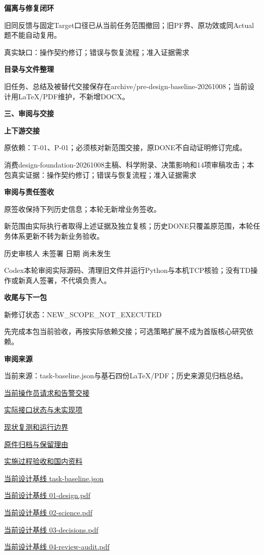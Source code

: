\documentclass[11pt,a4paper]{article}
\newcommand{\reviewsection}[1]{\par\Needspace{5\baselineskip}\vspace{10pt}\begin{center}{\titlelatin\titlecjk\bfseries\fontsize{14}{20}\selectfont #1}\end{center}}
\newcommand{\reviewsubsection}[1]{\par\Needspace{4\baselineskip}\vspace{4pt}\begin{center}{\titlelatin\titlecjk\bfseries\fontsize{12}{18}\selectfont #1}\end{center}}
\begin{document}
\reviewsubsection{2.3 偏离与修复闭环}
旧同反馈与固定Target口径已从当前任务范围撤回；旧PF界、原功效或同Actual题不能自动复用。


真实缺口：操作契约修订；错误与恢复流程；准入证据需求


\reviewsubsection{2.4 目录与文件整理}
旧任务、总结及被替代交接保存在archive/\allowbreak{}pre-\allowbreak{}design-\allowbreak{}baseline-\allowbreak{}20261008；当前设计用LaTeX/\allowbreak{}PDF维护，不新增DOCX。


\reviewsection{三、审阅与交接}
\reviewsubsection{3.1 上下游交接}
原依赖：T-\allowbreak{}01、P-\allowbreak{}01；必须核对新范围交接，原DONE不自动证明修订完成。


消费design-\allowbreak{}foundation-\allowbreak{}20261008主稿、科学附录、决策影响和14项审稿攻击；本包真实证据：操作契约修订；错误与恢复流程；准入证据需求


\reviewsubsection{3.2 审阅与责任签收}
原签收保持下列历史信息；本轮无新增业务签收。


新范围由实际执行者取得上述证据及独立复核；历史DONE只覆盖原范围，本轮任务体系更新不转为新业务验收。


历史审核人 未签署    日期 尚未发生


Codex本轮审阅实际源码、清理旧文件并运行Python与本机TCP核验；没有TD操作或新真人签署，不代填负责人。


\reviewsubsection{3.3 收尾与下一包}
新修订状态：NEW\_\allowbreak{}SCOPE\_\allowbreak{}NOT\_\allowbreak{}EXECUTED


先完成本包当前验收，再按实际依赖交接；可选策略扩展不成为首版核心研究依赖。


\reviewsubsection{3.4 审阅来源}
当前来源：task-\allowbreak{}baseline.json与基石四份LaTeX/\allowbreak{}PDF；历史来源见归档总结。


\href{file:///D:/Agent/srp/agent/tasks/T-02/outputs/current-operator-contract.md}{当前操作员请求和告警交接}


\href{file:///D:/Agent/srp/agent/tasks/T-02/outputs/current-operator-contract.json}{实际接口状态与未实现项}


\href{file:///D:/Agent/srp/agent/tasks/T-02/evidence/verification.json}{现状复测和运行边界}


\href{file:///D:/Agent/srp/agent/tasks/T-02/archive/README.md}{原件归档与保留理由}


\href{file:///D:/Agent/srp/agent/tasks/T-02/TASK.md}{实施过程验收和国内资料}


\href{file:///D:/Agent/srp/agent/design/design-foundation-20261008/task-baseline.json}{当前设计基线 task-\allowbreak{}baseline.json}


\href{file:///D:/Agent/srp/agent/design/design-foundation-20261008/01-design.pdf}{当前设计基线 01-\allowbreak{}design.pdf}


\href{file:///D:/Agent/srp/agent/design/design-foundation-20261008/02-science.pdf}{当前设计基线 02-\allowbreak{}science.pdf}


\href{file:///D:/Agent/srp/agent/design/design-foundation-20261008/03-decisions.pdf}{当前设计基线 03-\allowbreak{}decisions.pdf}


\href{file:///D:/Agent/srp/agent/design/design-foundation-20261008/04-review-audit.pdf}{当前设计基线 04-\allowbreak{}review-\allowbreak{}audit.pdf}
\end{document}
